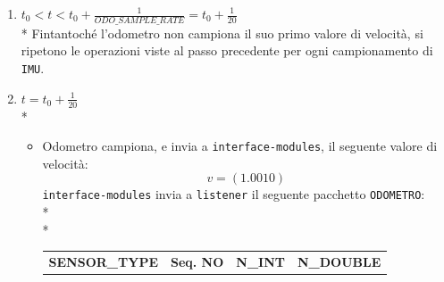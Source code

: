 \begin{enumerate}
\begin{itemize}
\begin{tabular}{|c|c|c|c|}
		\hline 
	\end{tabular}\\*\\*
	Accodandovi nell'ordine il vettore accelerazione, e il vettore velocit\`a angolare.
	\item \texttt{listener} riceve il pacchetto, crea e inoltra a SFA la seguente variabile \texttt{IMU\_POD}:
	\begin{itemize}
		\item \texttt{Seq.NO = 1}
		\item \texttt{Epoch = $t_0$}
		\item \texttt{ACC\_X = 0.0001}
		\item \texttt{ACC\_Y = -0.0001}
		\item \texttt{ACC\_Z = -9.8100}
		\item \texttt{GYRO\_X = 0.0003}
		\item \texttt{GYRO\_Y = -0.0001}
		\item \texttt{GYRO\_Z = 0.0002}
	\end{itemize}
\item SFA elabora i dati ricevuti e inizia una computazione parallela per fornire a \texttt{listener} una variabile \texttt{SFA\_OUTPUT\_POD} della forma:
	\begin{itemize}
		\item \texttt{Seq.NO = 0}
		\item \texttt{FU\_ARC\_LEN = }$P_{KM}$
	\end{itemize}
	\end{itemize}
	\item $t_0 < t < t_0 + \frac{1}{ODO\_SAMPLE\_RATE} = t_0 + \frac{1}{20}$\\*
	Fintantoch\'e l'odometro non campiona il suo primo valore di velocit\`a, si ripetono le operazioni viste al passo precedente per ogni campionamento di \texttt{IMU}.
	\item $t = t_0 + \frac{1}{20}$\\*
		\begin{itemize}
		\item Odometro campiona, e invia a \texttt{interface-modules}, il seguente valore di velocit\`a:
		$$
		v = (1.0010)
		$$
		\texttt{interface-modules} invia a \texttt{listener} il seguente pacchetto \texttt{ODOMETRO}:\\*\\*
		\begin{tabular}{|c|c|c|c|}
			\hline 
			\textbf{SENSOR\_TYPE} & \textbf{Seq. NO} & \textbf{N\_INT} & \textbf{N\_DOUBLE} \\ 

\end{tabular}
\end{itemize}
\end{enumerate}
